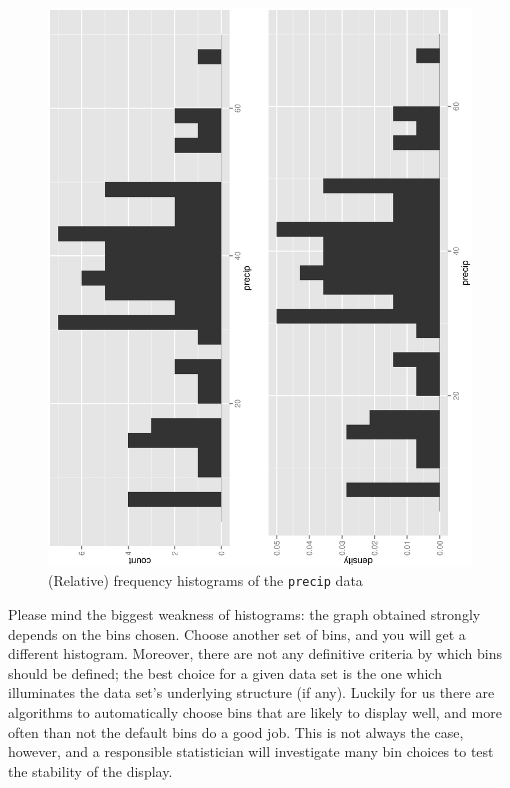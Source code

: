 \documentclass[10pt,english]{scrbook}
\begin{document}
\begin{exampletoo}
\begin{figure}[th]
  \includegraphics[angle=270, totalheight=4in]{ps/datadesc/histograms.ps}
  \caption{(Relative) frequency histograms of the \texttt{precip} data}
  \label{fig-histograms}
\end{figure}


\end{exampletoo}

Please mind the biggest weakness of histograms: the graph obtained strongly depends on the bins chosen. Choose another set of bins, and you will get a different histogram. Moreover, there are not any definitive criteria by which bins should be defined; the best choice for a given data set is the one which illuminates the data set's underlying structure (if any). Luckily for us there are algorithms to automatically choose bins that are likely to display well, and more often than not the default bins do a good job. This is not always the case, however, and a responsible statistician will investigate many bin choices to test the stability of the display.
\end{document}
